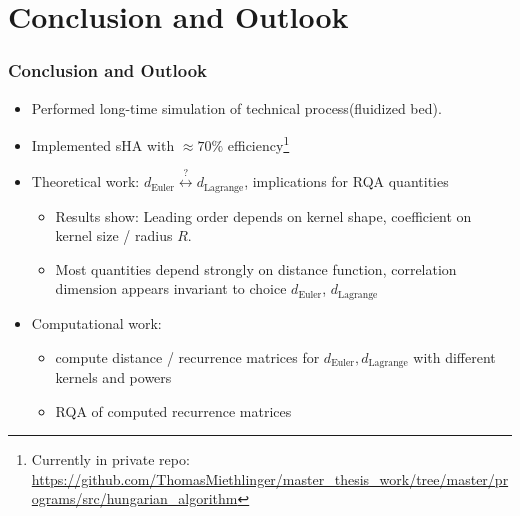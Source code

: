 \documentclass[9pt, english]{beamer}
\begin{document}
\section{Conclusion and Outlook}

\begin{frame}[fragile]
\frametitle{Conclusion and Outlook}
\begin{itemize}
 \item Performed long-time simulation of technical process(fluidized bed).
 \item Implemented sHA with \(\approx 70\%\) efficiency\footnote{Currently in private repo: \url{https://github.com/ThomasMiethlinger/master_thesis_work/tree/master/programs/src/hungarian_algorithm}}
 \item Theoretical work: \(d_{\text{Euler}} \stackrel{\text{?}}{\leftrightarrow} d_{\text{Lagrange}}\), implications for RQA quantities
 \begin{itemize}
  \item Results show: Leading order depends on kernel shape, coefficient on kernel size / radius \(R\).
  \item Most quantities depend strongly on distance function, correlation dimension appears invariant to choice \(d_{\text{Euler}}\), \(d_{\text{Lagrange}}\)
 \end{itemize}
 \item Computational work:
 \begin{itemize}
  \item compute distance / recurrence matrices for \(d_{\text{Euler}}, d_{\text{Lagrange}}\) with different kernels and powers
  \item RQA of computed recurrence matrices
 \end{itemize}
\end{itemize}
\end{frame}

\jkulogowhite
\end{document}
